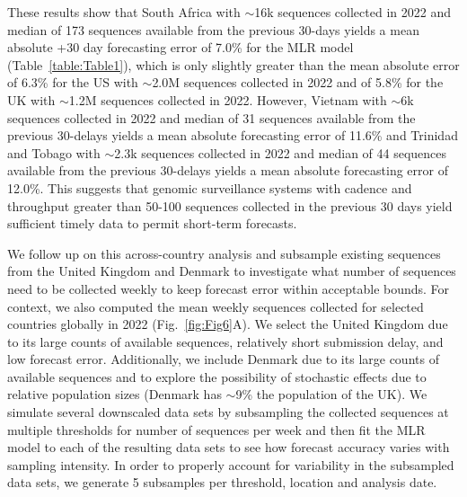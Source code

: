 These results show that South Africa with $\sim$16k sequences collected in 2022 and median of 173 sequences available from the previous 30-days yields a mean absolute +30 day forecasting error of 7.0\% for the MLR model (Table~\ref{table:Table1}), which is only slightly greater than the mean absolute error of 6.3\% for the US with $\sim$2.0M sequences collected in 2022 and of 5.8\% for the UK with $\sim$1.2M sequences collected in 2022.
However, Vietnam with $\sim$6k sequences collected in 2022 and median of 31 sequences available from the previous 30-delays yields a mean absolute forecasting error of 11.6\% and Trinidad and Tobago with $\sim$2.3k sequences collected in 2022 and median of 44 sequences available from the previous 30-delays yields a mean absolute forecasting error of 12.0\%.
This suggests that genomic surveillance systems with cadence and throughput greater than 50-100 sequences collected in the previous 30 days yield sufficient timely data to permit short-term forecasts.


We follow up on this across-country analysis and subsample existing sequences from the United Kingdom and Denmark to investigate what number of sequences need to be collected weekly to keep forecast error within acceptable bounds.
For context, we also computed the mean weekly sequences collected for selected countries globally in 2022 (Fig.~\ref{fig:Fig6}A).
We select the United Kingdom due to its large counts of available sequences, relatively short submission delay, and low forecast error.
Additionally, we include Denmark due to its large counts of available sequences and to explore the possibility of stochastic effects due to relative population sizes (Denmark has $\sim$9\% the population of the UK).
We simulate several downscaled data sets by subsampling the collected sequences at multiple thresholds for number of sequences per week and then fit the MLR model to each of the resulting data sets to see how forecast accuracy varies with sampling intensity.
In order to properly account for variability in the subsampled data sets, we generate 5 subsamples per threshold, location and analysis date.


